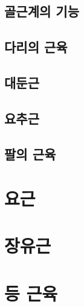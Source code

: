 \documentclass[12pt, a4paper, oneside]{book}
\let\stdsection\section
\renewcommand\section{\newpage\stdsection}
\begin{document}
	\subsection{골근계의 기능}
	
	
	
	\subsection{다리의 근육}
	
	\subsection{대둔근}
	
	
	\subsection{요추근}
	
	
	\subsection{팔의 근육}

		\section{요근}

		\section{장유근}

	
	



	



		\section{등 근육}
	
\end{document}
